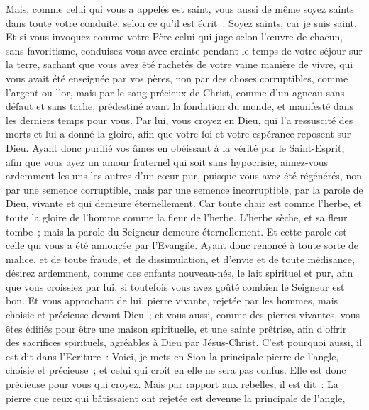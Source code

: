 \begin{multicols}{2}
Mais, comme celui qui vous a appelés est saint, vous aussi de même soyez saints dans toute votre conduite,
selon ce qu'il est écrit~: Soyez saints, car je suis saint.
Et si vous invoquez comme votre Père celui qui juge selon l'œuvre de chacun, sans favoritisme, conduisez-vous avec crainte pendant le temps de votre séjour sur la terre,
sachant que vous avez été rachetés de votre vaine manière de vivre, qui vous avait été enseignée par vos pères, non  par des choses corruptibles, comme l'argent ou l'or,
mais par le sang précieux de Christ, comme d'un agneau sans défaut et sans tache,
prédestiné avant la fondation du monde, et manifesté dans les derniers temps pour vous.
Par lui, vous croyez en Dieu, qui l'a ressuscité des morts et lui a donné la gloire, afin que votre foi et votre espérance reposent sur Dieu.
Ayant donc purifié vos âmes en obéissant à la vérité par le Saint-Esprit, afin que vous ayez un amour fraternel qui soit sans hypocrisie, aimez-vous ardemment les uns les autres d'un cœur pur,
puisque vous avez été régénérés, non par une semence corruptible, mais par une semence incorruptible, par la parole de Dieu, vivante et qui demeure éternellement.
Car toute chair est comme l'herbe, et toute la gloire de l'homme comme la fleur de l'herbe. L'herbe sèche, et sa fleur tombe~;
mais la parole du Seigneur demeure éternellement. Et cette parole est celle qui vous a été annoncée par l'Evangile.
\VerseOne{}Ayant donc renoncé à toute sorte de malice, et de toute fraude, et de dissimulation, et d'envie et de toute médisance,
désirez ardemment, comme des enfants nouveau-nés, le lait spirituel et pur, afin que vous croissiez par lui,
si toutefois vous avez goûté combien le Seigneur est bon.
Et vous approchant de lui, pierre vivante, rejetée par les hommes, mais choisie et précieuse devant Dieu~;
et vous aussi, comme des pierres vivantes, vous êtes édifiés pour être une maison spirituelle, et une sainte prêtrise, afin d'offrir des sacrifices spirituels, agréables à Dieu par Jésus-Christ. 
C'est pourquoi aussi, il est dit dans l'Ecriture~: Voici, je mets en Sion la principale pierre de l'angle, choisie et précieuse~; et celui qui croit en elle ne sera pas confus.
Elle est donc précieuse pour vous qui croyez. Mais par rapport aux rebelles, il est dit~: La pierre que ceux qui bâtissaient ont rejetée est devenue la principale de l'angle, 

\end{multicols}
